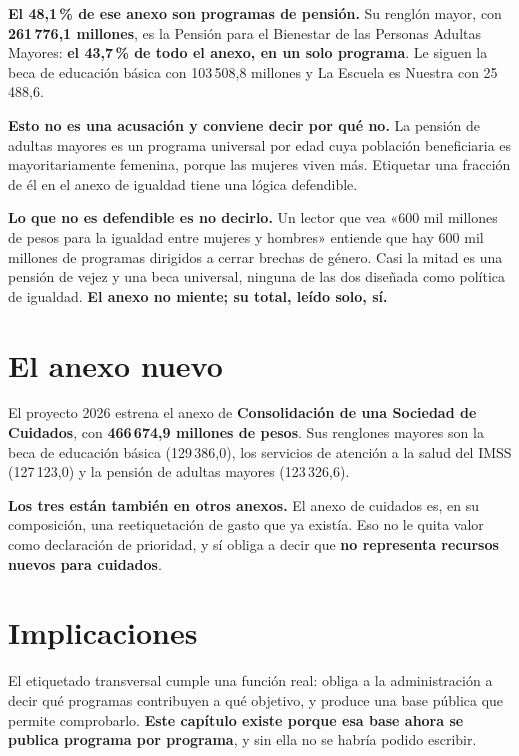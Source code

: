 \textbf{El 48,1\,\% de ese anexo son programas de pensión.} Su renglón mayor, con
\textbf{261\,776,1 millones}, es la Pensión para el Bienestar de las Personas Adultas Mayores:
\textbf{el 43,7\,\% de todo el anexo, en un solo programa}. Le siguen la beca de educación
básica con 103\,508,8 millones y La Escuela es Nuestra con 25\,488,6.

\textbf{Esto no es una acusación y conviene decir por qué no.} La pensión de adultas mayores
es un programa universal por edad cuya población beneficiaria es mayoritariamente femenina,
porque las mujeres viven más. Etiquetar una fracción de él en el anexo de igualdad tiene una
lógica defendible.

\textbf{Lo que no es defendible es no decirlo.} Un lector que vea «600 mil millones de pesos
para la igualdad entre mujeres y hombres» entiende que hay 600 mil millones de programas
dirigidos a cerrar brechas de género. Casi la mitad es una pensión de vejez y una beca
universal, ninguna de las dos diseñada como política de igualdad. \textbf{El anexo no miente;
su total, leído solo, sí.}

\section{El anexo nuevo}

El proyecto 2026 estrena el anexo de \textbf{Consolidación de una Sociedad de Cuidados}, con
\textbf{466\,674,9 millones de pesos}. Sus renglones mayores son la beca de educación básica
(129\,386,0), los servicios de atención a la salud del IMSS (127\,123,0) y la pensión de
adultas mayores (123\,326,6).

\textbf{Los tres están también en otros anexos.} El anexo de cuidados es, en su composición,
una reetiquetación de gasto que ya existía. Eso no le quita valor como declaración de
prioridad, y sí obliga a decir que \textbf{no representa recursos nuevos para cuidados}.

\section{Implicaciones}

El etiquetado transversal cumple una función real: obliga a la administración a decir qué
programas contribuyen a qué objetivo, y produce una base pública que permite comprobarlo.
\textbf{Este capítulo existe porque esa base ahora se publica programa por programa}, y sin
ella no se habría podido escribir.

